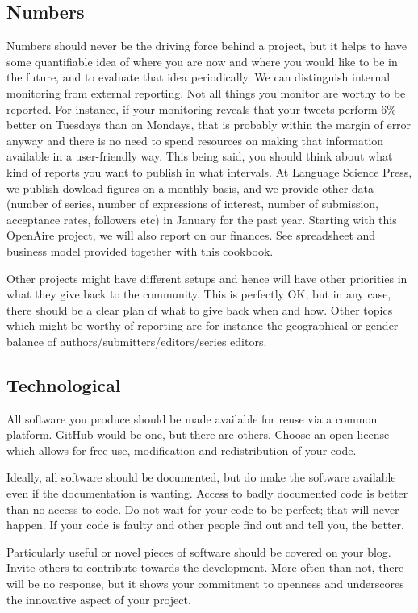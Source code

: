 \documentclass[guidelines,nonflat,modfonts] {langsci/langscibook}
\begin{document}
\subsection{Numbers}
Numbers should never be the driving force behind a project, but it helps to have some quantifiable idea of where you are now and where you would like to be in the future, and to evaluate that idea periodically. We can distinguish internal monitoring from external reporting. Not all things you monitor are worthy to be reported. For instance, if your monitoring reveals that your tweets perform 6\% better on Tuesdays than on Mondays, that is probably within the margin of error anyway and there is no need to spend resources on making that information available in a user-friendly way. This being said, you should think about what kind of reports you want to publish in what intervals. At Language Science Press, we publish dowload figures on a monthly basis, and we provide other data (number of series, number of expressions of interest, number of submission, acceptance rates, followers etc) in January for the past year. Starting with this OpenAire project, we will also report on our finances. See spreadsheet and business model provided together with this cookbook.

Other projects might have different setups and hence will have other priorities in what they give back to the community. This is perfectly OK, but in any case, there should be a clear plan of what to give back when and how. Other topics which might be worthy of reporting are for instance the geographical or gender balance of authors/submitters/editors/series editors.


\subsection{Technological}
All software you produce should be made available for reuse via a common platform. GitHub would be one, but there are others. Choose an open license which allows for free use, modification and redistribution of your code. 

Ideally, all software should be documented, but do make the software available even if the documentation is wanting. Access to badly documented code is better than no access to code. Do not wait for your code to be perfect; that will never happen. If your code is faulty and other people find out and tell you, the better.

Particularly useful or novel pieces of software should be covered on your blog. Invite others to contribute towards the development. More often than not, there will be no response, but it shows your commitment to openness and underscores the innovative aspect of your project. 
\end{document}

